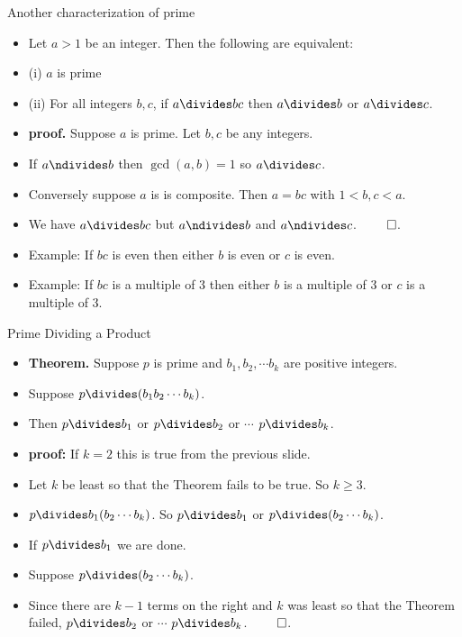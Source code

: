\documentclass[handout]{beamer}
\begin{document}

\begin{frame}{Another characterization of prime}
\begin{itemize}
  \item Let $a>1$ be an integer. Then the following are equivalent:
  \item (i) $a$ is prime
  \item (ii) For all integers $b,c$, if $a\divides bc$ then $a\divides b$ or $a\divides c$.
  \item \textbf{proof.} Suppose $a$ is prime. Let $b,c$ be any integers.
  \item If $a\ndivides b$ then $\gcd(a,b)=1$ so $a\divides c$.
  \item Conversely suppose $a$ is is composite. Then $a=bc$ with $1<b,c<a$.
  \item We have $a\divides bc$ but $a\ndivides b$ and $a\ndivides c$. $\qed$.
  \item Example: If $bc$ is even then either $b$ is even or $c$ is even.
  \item Example: If $bc$ is a multiple of 3 then either $b$ is a multiple of 3 or $c$ is a multiple of 3.
\end{itemize}

\end{frame}


\begin{frame}{Prime Dividing a Product}

\begin{itemize}
  \item \textbf{Theorem.} Suppose $p$ is prime and $b_1,b_2,\cdots b_k$ are positive integers.
  \item Suppose $p \divides (b_1 b_2 \cdots b_k)$.
  \item Then $p \divides b_1$ or $p\divides b_2$ or $\cdots$ $p\divides b_k$.
  \item \textbf{proof:} If $k=2$ this is true from the previous slide.
  \item Let $k$ be least so that the Theorem fails to be true. So $k\geq 3$.
  \item $p\divides b_1(b_2\cdots b_k)$. So $p\divides b_1$ or $p\divides (b_2\cdots b_k)$.
  \item If $p\divides b_1$ we are done.
  \item Suppose $p\divides (b_2\cdots b_k)$.
  \item Since there are $k-1$ terms on the right and $k$ was
  least so that the Theorem failed, $p\divides b_2$ or $\cdots$ $p\divides b_k$. $\qed$.
\end{itemize}

\end{frame}
\end{document}
